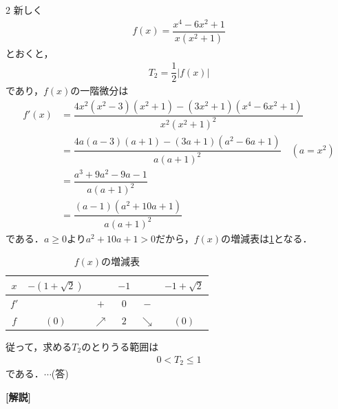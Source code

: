 \documentclass[../../main.tex]{subfiles}
\begin{document}
\begin{multicols}{2}
  新しく
  \begin{align}
    f(x) = \dfrac{x^4-6x^2+1}{x(x^2+1)}
  \end{align}
  とおくと，
  \begin{align}
    T_2 = \dfrac{1}{2}\left|f(x)\right|
  \end{align}
  であり，$f(x)$の一階微分は
  \begin{align}
    f'(x)
    & = \dfrac{4x^2(x^2-3)(x^2+1)-(3x^2+1)(x^4-6x^2+1)}{x^2(x^2+1)^2} \\
    & = \dfrac{4a(a-3)(a+1)-(3a+1)(a^2-6a+1)}{a(a+1)^2} \quad (a=x^2) \\
    & = \dfrac{a^3+9a^2-9a-1}{a(a+1)^2}                               \\
    & = \dfrac{(a-1)(a^2+10a+1)}{a(a+1)^2}
  \end{align}
  である．$a\ge 0$より$a^2+10a+1>0$だから，$f(x)$の増減表は\cref{1997-2:table:2}となる．
  \begin{table}[H]
    \centering
    \caption{$f(x)$の増減表}
    \label{1997-2:table:2}
    \begin{tabular}{|c||c|c|c|c|c|}
      \hline
      $x$  & $-(1+\sqrt{2})$ &            & $-1$ &            & $-1+\sqrt{2}$ \\
      \hline
      $f'$ &                 & $+$        & $0$  & $-$        &               \\
      \hline
      $f$  & $(0)$           & $\nearrow$ & $2$  & $\searrow$ & $(0)$         \\
      \hline
    \end{tabular}
  \end{table}
  従って，求める$T_2$のとりうる範囲は
  \begin{align}
    0 < T_2 \leq 1
  \end{align}
  である．$\cdots$(答)

  {\bf [解説]}

  \newpage
\end{multicols}
\end{document}
